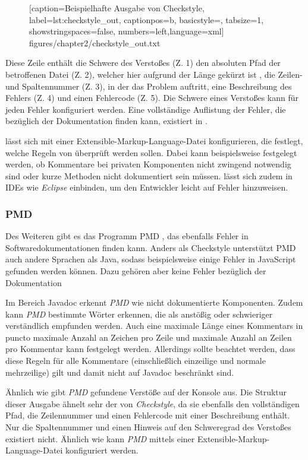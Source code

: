 	\begin{figure}[h!]
			
			[caption={Beispielhafte Ausgabe von Checkstyle},
			label={lst:checkstyle_out},
			captionpos=b, basicstyle=\footnotesize, tabsize=1, showstringspaces=false,  numbers=left,language=xml]
			{figures/chapter2/checkstyle_out.txt}
		\end{figure}
		
Diese Zeile enthält die Schwere des Verstoßes (Z. 1) den absoluten Pfad der betroffenen Datei (Z. 2), welcher hier aufgrund der Länge gekürzt ist , die Zeilen- und Spaltennummer (Z. 3), in der das Problem auftritt, eine Beschreibung des Fehlers (Z. 4) und einen Fehlercode (Z. 5). Die Schwere eines Verstoßes kann für jeden Fehler konfiguriert werden. Eine vollständige Auflistung der Fehler, die \cs bezüglich der Dokumentation finden kann,  existiert in \cite{checkstyle_doc_metrics}.

			
\cs lässt sich mit einer Extensible-Markup-Language-Datei konfigurieren, die festlegt, welche Regeln von \cs überprüft werden sollen. Dabei kann beispielsweise festgelegt werden, ob Kommentare bei privaten Komponenten nicht zwingend notwendig sind oder kurze Methoden nicht dokumentiert sein müssen.
\cs lässt sich zudem in \ac{IDE}s wie \textit{Eclipse} einbinden, um den Entwickler leicht auf Fehler hinzuweisen. 
\subsubsection{PMD}
Des Weiteren gibt es das Programm PMD \cite{PMD}, das ebenfalls Fehler in Softwaredokumentationen finden kann.  Anders als Checkstyle unterstützt PMD auch andere Sprachen als Java, sodass beispielsweise einige Fehler in JavaScript gefunden werden können. Dazu gehören aber keine Fehler bezüglich der Dokumentation

Im Bereich  Javadoc erkennt \textit{PMD} wie \cs nicht dokumentierte Komponenten. Zudem kann \textit{PMD} bestimmte Wörter erkennen, die als anstößig oder schwieriger verständlich empfunden werden. Auch eine maximale Länge eines Kommentars in puncto maximale Anzahl an Zeichen pro Zeile und maximale Anzahl an Zeilen pro Kommentar kann festgelegt werden. Allerdings sollte beachtet werden, dass diese Regeln für alle Kommentare (einschließlich einzeilige und normale mehrzeilige) gilt und damit nicht auf Javadoc beschränkt sind. 

Ähnlich wie \cs gibt \textit{PMD} gefundene Verstöße auf der Konsole aus. Die Struktur dieser Ausgabe ähnelt sehr der von \textit{Checkstyle}, da sie ebenfalls den vollständigen Pfad, die Zeilennummer und einen Fehlercode mit einer Beschreibung enthält. Nur die Spaltennummer  und einen Hinweis auf den Schweregrad des Verstoßes existiert nicht. Ähnlich wie \cs kann \textit{PMD} mittels einer Extensible-Markup-Language-Datei konfiguriert werden.


